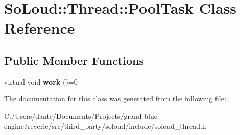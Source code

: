 \hypertarget{class_so_loud_1_1_thread_1_1_pool_task}{}\section{So\+Loud\+::Thread\+::Pool\+Task Class Reference}
\label{class_so_loud_1_1_thread_1_1_pool_task}
\subsection*{Public Member Functions}
\begin{DoxyCompactItemize}
\item 
\mbox{\label{class_so_loud_1_1_thread_1_1_pool_task_a9f442c060d3964d6b845709548cae8dc}} 
virtual void {\bfseries work} ()=0
\end{DoxyCompactItemize}


The documentation for this class was generated from the following file\+:\begin{DoxyCompactItemize}
\item 
C\+:/\+Users/dante/\+Documents/\+Projects/grand-\/blue-\/engine/reverie/src/third\+\_\+party/soloud/include/soloud\+\_\+thread.\+h\end{DoxyCompactItemize}
